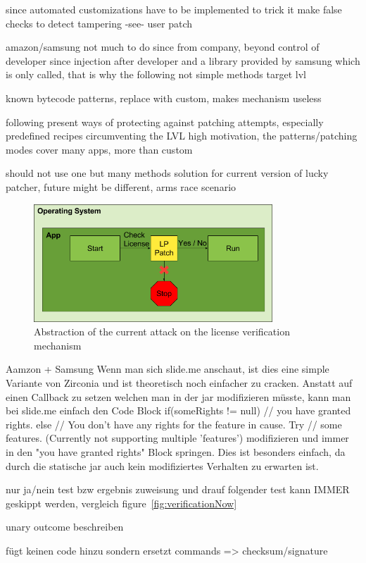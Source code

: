 since automated customizations have to be implemented to trick it
make false checks to detect tampering -see- user patch

amazon/samsung not much to do since from company, beyond control of developer since injection after developer and a library provided by samsung which is only called, that is why the following not simple methods target lvl

known bytecode patterns, replace with custom, makes mechanism useless

following present ways of protecting against patching attempts, especially predefined recipes circumventing the LVL
high motivation, the patterns/patching modes cover many apps, more than custom

should not use one but many methods
solution for current version of lucky patcher, future might be different, arms race scenario
\cite{munteanLicense}
%

\begin{figure}[h]
    \centering
    \includegraphics[width=0.8\textwidth]{data/verificationNowAttack.png}
    \caption{Abstraction of the current attack on the license verification mechanism}
    \label{fig:verificationNowAttack}
\end{figure}


Aamzon + Samsung
Wenn man sich slide.me anschaut, ist dies eine simple Variante von Zirconia und ist theoretisch noch einfacher zu cracken. Anstatt auf einen Callback zu setzen welchen man in der jar modifizieren müsste, kann man bei slide.me einfach den Code Block
 if(someRights != null){
        // you have granted rights.
    } else {
        // You don't have any rights for the feature in cause. Try
        // some features. (Currently not supporting multiple 'features')
    }
modifizieren und immer in den "you have granted rights" Block springen. Dies ist besonders einfach, da durch die statische jar auch kein modifiziertes Verhalten zu erwarten ist.


nur ja/nein test bzw ergebnis zuweisung und drauf folgender test kann IMMER geskippt werden, vergleich figure~\ref{fig:verificationNow}

unary outcome beschreiben

fügt keinen code hinzu sondern ersetzt commands => checksum/signature
